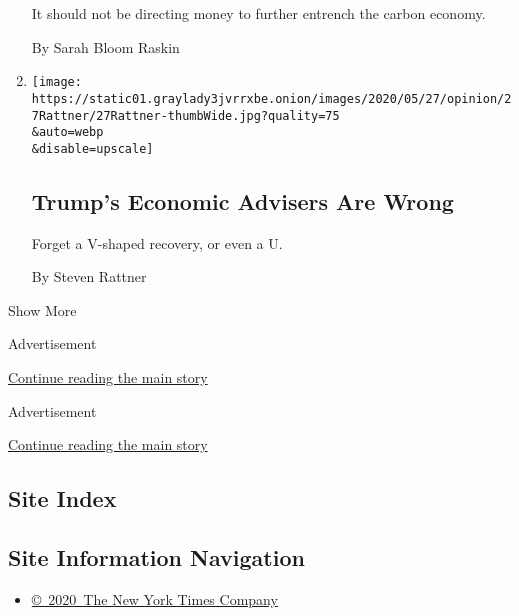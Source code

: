 \begin{enumerate}
  It should not be directing money to further entrench the carbon
  economy.

  By Sarah Bloom Raskin
\item
  \href{/2020/05/27/opinion/coronavirus-economy-stimulus.html}{}

  \texttt{[image: https://static01.graylady3jvrrxbe.onion/images/2020/05/27/opinion/27Rattner/27Rattner-thumbWide.jpg?quality=75\\\&auto=webp\\\&disable=upscale]}

  \hypertarget{trumps-economic-advisers-are-wrong}{%
  \subsection{Trump's Economic Advisers Are
  Wrong}\label{trumps-economic-advisers-are-wrong}}

  Forget a V-shaped recovery, or even a U.

  By Steven Rattner
\end{enumerate}

Show More

Advertisement

\protect\hyperlink{after-mid1}{Continue reading the main story}

Advertisement

\protect\hyperlink{after-mktg}{Continue reading the main story}

\hypertarget{site-index}{%
\subsection{Site Index}\label{site-index}}

\hypertarget{site-information-navigation}{%
\subsection{Site Information
Navigation}\label{site-information-navigation}}

\begin{itemize}
\tightlist
\item
  \href{https://help.nytimes3xbfgragh.onion/hc/en-us/articles/115014792127-Copyright-notice}{©~2020~The
  New York Times Company}
\end{itemize}


